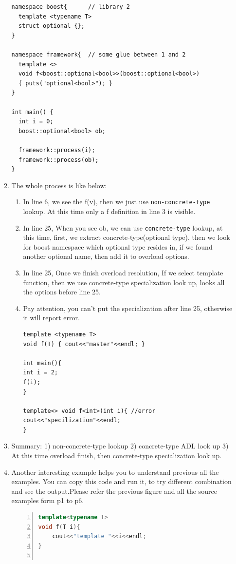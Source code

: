 \documentclass[a4paper,11pt,twoside]{book}
\begin{document}
\begin{itemize}
\begin{enumerate}
\begin{lstlisting}[numbers=none]
namespace boost{      // library 2
  template <typename T>
  struct optional {};
}
 
namespace framework{  // some glue between 1 and 2
  template <>
  void f<boost::optional<bool>>(boost::optional<bool>)
  { puts("optional<bool>"); }
}
 
int main() {
  int i = 0;
  boost::optional<bool> ob;
  
  framework::process(i);
  framework::process(ob);
}
\end{lstlisting}

	\item The whole process is like below:
	\begin{enumerate}
		\item In line 6, we see the f(v), then we just use \texttt{non-concrete-type} lookup. At this time only a f definition in line 3 is visible.
		
		\item In line 25, When you see ob, we can use \texttt{concrete-type} lookup, at this time, first, we extract concrete-type(optional type), then we look for boost namespace which optional type resides in, if we found another optional name, then add it to overload options. 
		
		\item In line 25, Once we finish overload resolution, If we select template function, then we use concrete-type specialization look up, looks all the options before line 25.
		
		\item Pay attention, you can't put the specialization after line 25, otherwise it will report error.
\begin{lstlisting}
template <typename T>
void f(T) { cout<<"master"<<endl; }

int main(){
int i = 2;
f(i);
}

template<> void f<int>(int i){ //error
cout<<"specilization"<<endl;
}
\end{lstlisting}
	\end{enumerate}
	\item Summary: 1) non-concrete-type lookup 2) concrete-type ADL look up 3) At this time overload finish, then concrete-type specialization look up.


\item Another interesting example helps you to understand previous all the examples. You can copy this code and run it, to try different combination and see the output.Please refer the previous figure and all the source examples form p1 to p6. 
\begin{lstlisting}[frame=single, language=c++, numbers=left,
stepnumber=1,]
template<typename T>
void f(T i){
	cout<<"template "<<i<<endl;
}


\end{lstlisting}
\end{enumerate}
\end{itemize}
\end{document}
